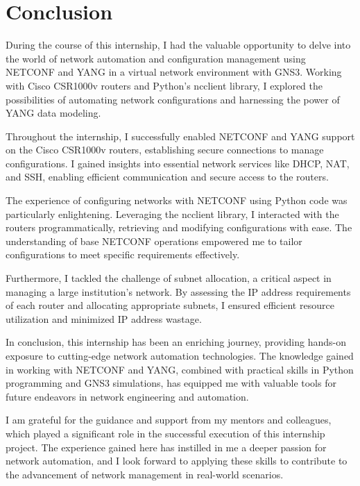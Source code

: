 \chapter{Conclusion}


During the course of this internship, I had the valuable opportunity to delve into the world of network automation and configuration management using NETCONF and YANG in a virtual network environment with GNS3. Working with Cisco CSR1000v routers and Python's ncclient library, I explored the possibilities of automating network configurations and harnessing the power of YANG data modeling.

Throughout the internship, I successfully enabled NETCONF and YANG support on the Cisco CSR1000v routers, establishing secure connections to manage configurations. I gained insights into essential network services like DHCP, NAT, and SSH, enabling efficient communication and secure access to the routers.

The experience of configuring networks with NETCONF using Python code was particularly enlightening. Leveraging the ncclient library, I interacted with the routers programmatically, retrieving and modifying configurations with ease. The understanding of base NETCONF operations empowered me to tailor configurations to meet specific requirements effectively.

Furthermore, I tackled the challenge of subnet allocation, a critical aspect in managing a large institution's network. By assessing the IP address requirements of each router and allocating appropriate subnets, I ensured efficient resource utilization and minimized IP address wastage.

In conclusion, this internship has been an enriching journey, providing hands-on exposure to cutting-edge network automation technologies. The knowledge gained in working with NETCONF and YANG, combined with practical skills in Python programming and GNS3 simulations, has equipped me with valuable tools for future endeavors in network engineering and automation.

I am grateful for the guidance and support from my mentors and colleagues, which played a significant role in the successful execution of this internship project. The experience gained here has instilled in me a deeper passion for network automation, and I look forward to applying these skills to contribute to the advancement of network management in real-world scenarios.